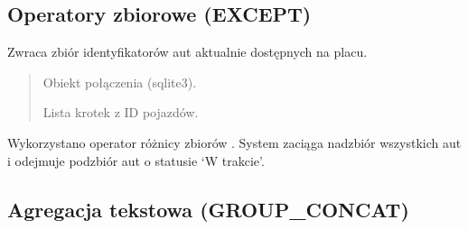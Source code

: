 \documentclass[a4paper,11pt,english,openany,oneside]{sphinxmanual}
\begin{document}
\subsection{Operatory zbiorowe (EXCEPT)}
\label{\detokenize{rozdzial_5/index:operatory-zbiorowe-except}}

\begin{savenotes}\begin{fulllineitems}

\pysigstartsignatures
\pysiglinewithargsret
{}
{}
{}
\pysigstopsignatures
\sphinxAtStartPar
Zwraca zbiór identyfikatorów aut aktualnie dostępnych na placu.
\begin{quote}\begin{description}
\sphinxAtStartPar
{} \textendash{} Obiekt połączenia (sqlite3).

\sphinxAtStartPar
Lista krotek z ID pojazdów.

\end{description}\end{quote}

\sphinxAtStartPar
{} Wykorzystano operator różnicy zbiorów . System zaciąga nadzbiór wszystkich aut i odejmuje podzbiór aut o statusie ‘W trakcie’.

\end{fulllineitems}\end{savenotes}



\subsection{Agregacja tekstowa (GROUP\_CONCAT)}
\label{\detokenize{rozdzial_5/index:agregacja-tekstowa-group-concat}}
\end{document}
